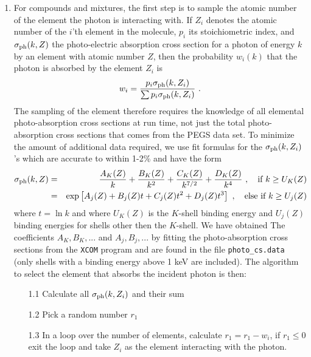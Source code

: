 \begin{enumerate}
\item
For compounds and mixtures, the first step is to sample the
atomic number of the element the
photon is interacting with.
If $Z_i$ denotes the atomic number of the $i$'th element in
the molecule, $p_i$ its stoichiometric index, and
$\sigma_{\rm ph}(k,Z)$ the photo-electric absorption
cross section for a photon of energy $k$ by an element
with atomic number $Z$, then the probability $w_i(k)$ that
the photon is absorbed by the element $Z_i$ is
\begin{equation}
w_i = {p_i \sigma_{\rm ph}(k,Z_i) \over \sum p_i \sigma_{\rm ph}(k,Z_i)}~.
\end{equation}
The sampling of the element therefore requires the knowledge of
all elemental photo-absorption cross sections at run time, not
just the total photo-absorption cross sections that comes from
the PEGS data set. To minimize the amount of additional data
required, we use fit formulas for the $\sigma_{\rm ph}(k,Z_i)$'s
which are accurate to within 1-2\% and have the form
\begin{eqnarray}
\sigma_{\rm ph}(k,Z) & = & \frac{A_K(Z)}{k} + \frac{B_K(Z)}{k^2} +
\frac{C_K(Z)}{k^{7/2}} + \frac{D_K(Z)}{k^4}~, \quad \mbox{if}~k \ge U_K(Z)
\\
& = & \exp \left[A_j(Z) + B_j(Z) t + C_j(Z) t^2 + D_j(Z) t^3
\right]~, \quad \mbox{else if}~k \ge U_j(Z)
\nonumber
\end{eqnarray}
where $t = \ln k$ and where $U_K(Z)$ is the
$K$-shell binding energy and $U_j(Z)$ binding
energies for shells other then the $K$-shell. We have obtained The
coefficients $A_K, B_K, ...$ and $A_j, B_j, ...$
by fitting the photo-absorption cross sections from the {\tt XCOM} program
\cite{BH87} and are found in the file {\tt photo\_cs.data}
(only shells with a binding energy above 1 keV are included).
The algorithm to select the element that absorbs the
incident photon is then:
\begin{itemize}
\item[1.1] Calculate all $\sigma_{\rm ph}(k,Z_i)$ and
their sum
\item[1.2] Pick a random number $r_1$
\item[1.3] In a loop over the number of elements, calculate
$r_1 = r_1 - w_i$, if $r_1 \le 0$ exit the loop and take
$Z_i$ as the element interacting with the photon.
\end{itemize}

\end{enumerate}
